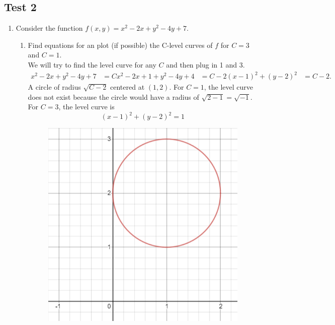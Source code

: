 \subsection{Test 2}
\begin{enumerate}
	\item Consider the function $f(x,y) = x^2 - 2x + y^2 - 4y + 7$.\\
	\begin{enumerate}[label=\alph*.]
		\item Find equations for an plot (if possible) the C-level curves of $f$ for $C = 3$ and $C = 1$.\\
		We will try to find the level curve for any $C$ and then plug in 1 and 3.
		\begin{align*}
			x^2 - 2x + y^2 - 4y + 7 &= C
			x^2 - 2x + 1 + y^2 - 4y + 4 &= C-2
			(x-1)^2 + (y-2)^2 &= C-2		.
		\end{align*}
		A circle of radius $\sqrt{C-2}$ centered at $(1,2)$.
		For $C = 1$, the level curve does not exist because the circle would have a radius of $\sqrt{2-1} = \sqrt{-1}$.
		For $C = 3$, the level curve is 
		\begin{equation*}
			(x-1)^2 + (y-2)^2 = 1
		\end{equation*}
		
		\begin{figure}[H]
			\centering
			\includegraphics[scale=.25]{./additionalMaterials/test2_circle.png}
		\end{figure}
		

\end{enumerate}
\end{enumerate}
